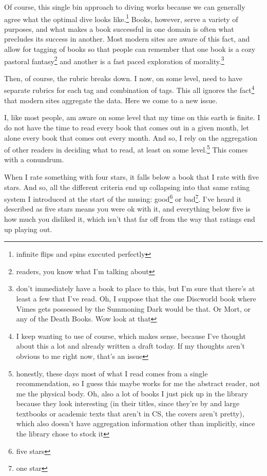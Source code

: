 \documentclass[12pt]{article}[titlepage]
\newcommand{\1}{\={a}}
\newcommand{\2}{\={e}}
\newcommand{\3}{\={\i}}
\newcommand{\4}{\=o}
\newcommand{\5}{\=u}
\newcommand{\6}{\={A}}
\renewcommand{\,}{\textsuperscript{,}}
\begin{document}
Of course, this single bin approach to diving works because we can generally agree what the optimal dive looks like.\footnote{infinite flips and spins executed perfectly}
Books, however, serve a variety of purposes, and what makes a book successful in one domain is often what precludes its success in another.
Most modern sites are aware of this fact, and allow for tagging of books so that people can remember that one book is a cozy pastoral fantasy\footnote{readers, you know what I'm talking about} and another is a fast paced exploration of morality.\footnote{don't immediately have a book to place to this, but I'm sure that there's at least a few that I've read. Oh, I suppose that the one Discworld book where Vimes gets possessed by the Summoning Dark would be that. Or Mort, or any of the Death Books. Wow look at that}

Then, of course, the rubric breaks down.
I now, on some level, need to have separate rubrics for each tag and combination of tags.
This all ignores the fact\footnote{I keep wanting to use of course, which makes sense, because I've thought about this a lot and already written a draft today. If my thoughts aren't obvious to me right now, that's an issue} that modern sites aggregate the data.
Here we come to a new issue.

I, like most people, am aware on some level that my time on this earth is finite.
I do not have the time to read every book that comes out in a given month, let alone every book that comes out every month.
And so, I rely on the aggregation of other readers in deciding what to read, at least on some level.\footnote{honestly, these days most of what I read comes from a single recommendation, so I guess this maybe works for me the abstract reader, not me the physical body. Oh, also a lot of books I just pick up in the library because they look interesting (in their titles, since they're by and large textbooks or academic texts that aren't in CS, the covers aren't pretty), which also doesn't have aggregation information other than implicitly, since the library chose to stock it}
This comes with a conundrum.

When I rate something with four stars, it falls below a book that I rate with five stars.
And so, all the different criteria end up collapsing into that same rating system I introduced at the start of the musing: good\footnote{five stars} or bad\footnote{one star}.
I've heard it described as five stars means you were ok with it, and everything below five is how much you disliked it, which isn't that far off from the way that ratings end up playing out.
\end{document}
